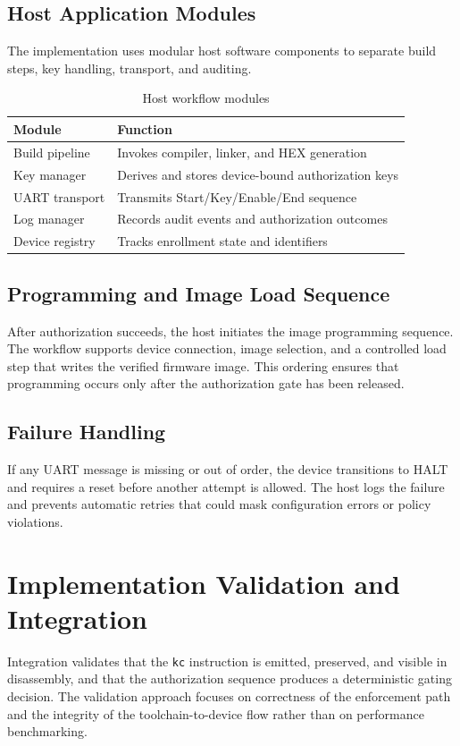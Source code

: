 \subsection{Host Application Modules}
The implementation uses modular host software components to separate build steps, key
handling, transport, and auditing.

\begin{table}[H]
  \centering
  \caption{Host workflow modules}
  \label{tab:impl-host-modules}
  \begin{tabular}{@{}p{3.8cm}p{8.2cm}@{}}
    \toprule
    \textbf{Module} & \textbf{Function} \\
    \midrule
    Build pipeline & Invokes compiler, linker, and HEX generation \\
    Key manager & Derives and stores device-bound authorization keys \\
    UART transport & Transmits Start/Key/Enable/End sequence \\
    Log manager & Records audit events and authorization outcomes \\
    Device registry & Tracks enrollment state and identifiers \\
    \bottomrule
  \end{tabular}
\end{table}

\subsection{Programming and Image Load Sequence}
After authorization succeeds, the host initiates the image programming sequence. The workflow
supports device connection, image selection, and a controlled load step that writes the
verified firmware image. This ordering ensures that programming occurs only after the
authorization gate has been released.

\subsection{Failure Handling}
If any UART message is missing or out of order, the device transitions to \textsf{HALT} and
requires a reset before another attempt is allowed. The host logs the failure and prevents
automatic retries that could mask configuration errors or policy violations.

\section{Implementation Validation and Integration}
Integration validates that the \texttt{kc} instruction is emitted, preserved, and visible in
disassembly, and that the authorization sequence produces a deterministic gating decision. The
validation approach focuses on correctness of the enforcement path and the integrity of the
toolchain-to-device flow rather than on performance benchmarking.

